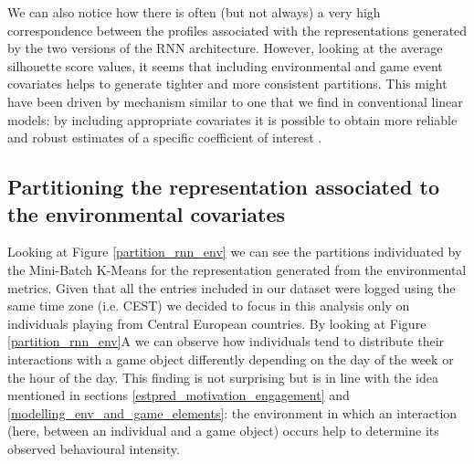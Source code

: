 We can also notice how there is often (but not always) a very high correspondence between the profiles associated with the representations generated by the two versions of the RNN architecture. However, looking at the average silhouette score values, it seems that including environmental and game event covariates helps to generate tighter and more consistent partitions. This might have been driven by mechanism similar to one that we find in conventional linear models: by including appropriate covariates it is possible to obtain more reliable and robust estimates of a specific coefficient of interest \cite{gelman2020regression}.

\subsection{Partitioning the representation associated to the environmental covariates}
\label{partition_environment}
Looking at Figure \ref{partition_rnn_env} we can see the partitions individuated by the Mini-Batch K-Means for the representation generated from the environmental metrics. Given that all the entries included in our dataset were logged using the same time zone (i.e. CEST) we decided to focus in this analysis only on individuals playing from Central European countries. By looking at Figure \ref{partition_rnn_env}A we can observe how individuals tend to distribute their interactions with a game object differently depending on the day of the week or the hour of the day. This finding is not surprising but is in line with the idea mentioned in sections \ref{estpred_motivation_engagement} and \ref{modelling_env_and_game_elements}: the environment in which an interaction (here, between an individual and a game object) occurs help to determine its observed behavioural intensity. 
